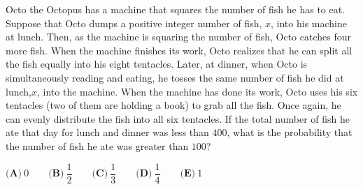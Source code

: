 Octo the Octopus has a machine that squares the number of fish he has to eat. Suppose that Octo dumps a positive integer number of fish, $x$, into his machine at lunch. Then, as the machine is squaring the number of fish, Octo catches four more fish. When the machine finishes its work, Octo realizes that he can split all the fish equally into his eight tentacles. Later, at dinner, when Octo is simultaneously reading and eating, he tosses the same number of fish he did at lunch,$x$, into the machine. When the machine has done its work, Octo uses his six tentacles (two of them are holding a book) to grab all the fish. Once again, he can evenly distribute the fish into all six tentacles. If the total number of fish he ate that day for lunch and dinner was less than $400$, what is the probability that the number of fish he ate was greater than $100$?

$\textbf{(A)}~0\qquad\textbf{(B)}~\dfrac{1}{2}\qquad\textbf{(C)}~\dfrac{1}{3}\qquad\textbf{(D)}~\dfrac{1}{4}\qquad\textbf{(E)}~1\qquad$
